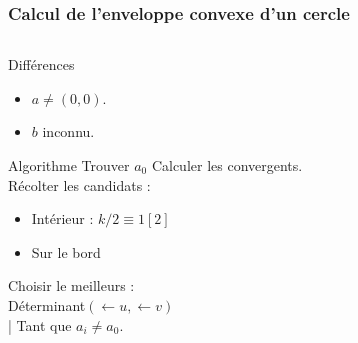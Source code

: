 \documentclass{beamer}
\begin{document}
\begin{frame}
\frametitle{Calcul de l'enveloppe convexe d'un cercle}
\begin{columns}[t]
  \begin{column}{4cm}
  
  \begin{block}{Différences}
    \begin{itemize}
      \item $a\ne (0, 0)$.
      \item $b$ inconnu.
    \end{itemize}
  \end{block}
  
    \begin{block}{Algorithme}
    Trouver $a_0$
    Calculer les convergents.\\
    Récolter les candidats :
    \begin{itemize}
      \item Intérieur : $k / 2 \equiv 1 [2]$ 
      \item Sur le bord
    \end{itemize}
    Choisir le meilleurs :\\
    \alert{Déterminant$(\leftarrow{u}, \leftarrow{v})$}\\
    | Tant que $ a_{i} \ne a_0$.
 
  \end{block}
    
  \end{column}


\end{columns}
\end{frame}
\end{document}
